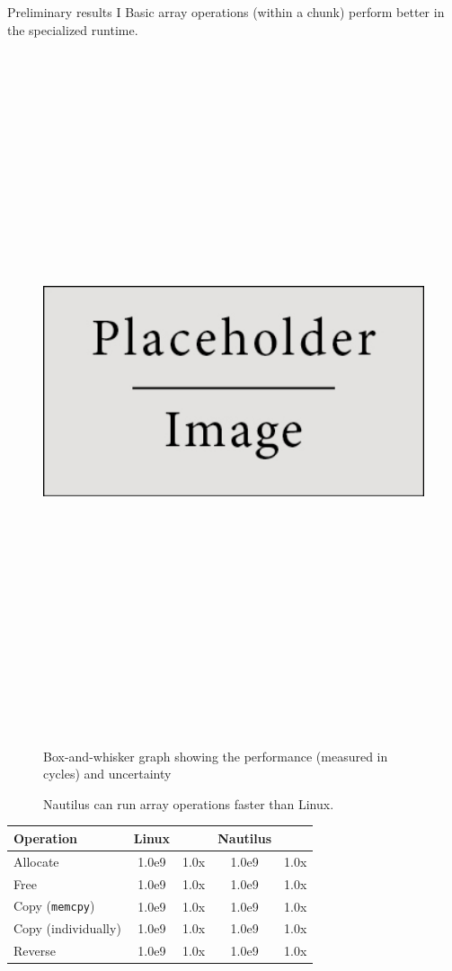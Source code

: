 \begin{block}{Preliminary results I}
  Basic array operations (within a chunk) perform better in the specialized runtime.

  \begin{figure}
    \includegraphics[height=20cm]{place_holder.png}

    Box-and-whisker graph showing the performance (measured in cycles) and uncertainty
    \caption{Nautilus can run array operations faster than Linux.}
  \end{figure}

  \begin{table}
    \begin{tabular}{l || c c | c c}
      Operation & Linux & & Nautilus & \\
      \hline\hline
      Allocate & 1.0e9 & 1.0x & 1.0e9 & 1.0x \\\hline
      Free & 1.0e9 & 1.0x & 1.0e9 & 1.0x \\\hline
      Copy (\texttt{memcpy}) & 1.0e9 & 1.0x & 1.0e9 & 1.0x \\\hline
      Copy (individually) & 1.0e9 & 1.0x & 1.0e9 & 1.0x \\\hline
      Reverse & 1.0e9 & 1.0x & 1.0e9 & 1.0x \\
    \end{tabular}


\end{table}
\end{block}
